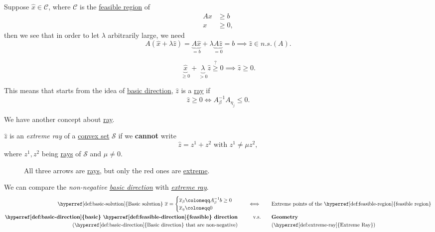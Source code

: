 Suppose \(\hat{x}\in\mathcal{C}\), where \(\mathcal{C}\) is the \hyperref[def:feasible-region]{feasible region} of
\[
	\begin{aligned}
		Ax & \geq b  \\
		x  & \geq 0,
	\end{aligned}
\]
then we see that in order to let \(\lambda\) arbitrarily large, we need
\[
	A(\hat{x} + \lambda \hat{z}) = \underbrace{A \hat{x}}_{=b} + \lambda \underbrace{A \hat{z}}_{=0} = b\implies \hat{z} \in n.s.(A).
\]

\begin{problem}
\[
	\underbrace{\hat{x}}_{\geq 0} + \underbrace{\lambda}_{>0} \hat{z} \overset{?}{\geq} 0 \implies \hat{z} \geq 0.
\]
\end{problem}

This means that starts from the idea of \hyperref[def:basic-direction]{basic direction}, \(\hat{z}\) is a \hyperref[def:ray]{ray} if
\[
	\hat{z} \geq 0 \iff A^{-1}_{\beta}A_{\eta_j} \leq 0.
\]

We have another concept about \hyperref[def:ray]{ray}.
\begin{definition}\label{def:extreme-ray}
	\(\hat{z}\) is an \emph{extreme ray} of a \hyperref[def:convex-set]{convex set} \(\mathcal{S}\) if we \textbf{cannot} write
	\[
		\hat{z} = z^1 + z^2 \text{ with }z^1 \neq \mu z^2,
	\]
	where \(z^1, z^2\) being \hyperref[def:ray]{rays} of \(\mathcal{S}\) and \(\mu\neq 0\).
	\begin{figure}[H]
		\centering
		\caption{All three arrows are \hyperref[def:ray]{rays}, but only the red ones are \hyperref[def:extreme-ray]{extreme}.}
		\label{fig:extreme-ray}
	\end{figure}
\end{definition}

\begin{remark}
	We can compare the \emph{non-negative \hyperref[def:basic-direction]{basic direction}} with \emph{\hyperref[def:extreme-ray]{extreme ray}}.
	\[
		\begin{alignedat}{4}
			\text{\hyperref[def:basic-solution]{Basic solution} }\overline{x}=\begin{cases}
				\overline{x}_{\beta}\coloneqq A^{-1}_{\beta}b\geq 0 \\
				\overline{x}_{\eta} \coloneqq 0
			\end{cases} &&\qquad\iff\qquad&\text{Extreme points of the \hyperref[def:feasible-region]{feasible region}}\\
			\text{\textbf{\hyperref[def:basic-direction]{basic} \hyperref[def:feasible-direction]{feasible} direction}} && \qquad \text{v.s.}\qquad&\text{\textbf{Geometry}}\\
			\text{(\hyperref[def:basic-direction]{Basic direction} that are non-negative)}&& &\text{(\hyperref[def:extreme-ray]{Extreme Ray})}
		\end{alignedat}
	\]
\end{remark}